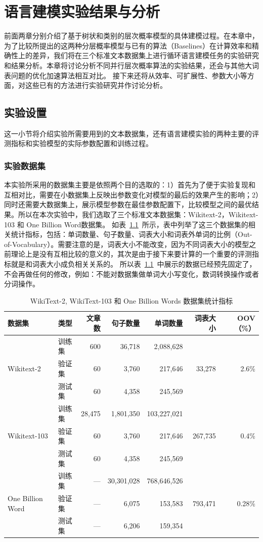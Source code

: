 
\chapter{语言建模实验结果与分析}
前面两章分别介绍了基于树状和类别的层次概率模型的具体建模过程。在本章中，为了比较所提出的这两种分层概率模型与已有的算法（Baselines）在计算效率和精确性上的差异，我们将在三个标准文本数据集上进行循环语言建模任务的实验研究和结果分析。本章将讨论分析不同并行层次概率算法的实验结果，还会与其他大词表问题的优化加速算法相互对比。 接下来还将从效率、可扩展性、参数大小等方面，对这些已有的方法进行实验研究并作讨论分析。

\section{实验设置}
这一小节将介绍实验所需要用到的文本数据集，还有语言建模实验的两种主要的评测指标和实验模型的实际参数配置和训练过程。
\subsection{实验数据集}
本实验所采用的数据集主要是依照两个目的选取的：1）首先为了便于实验复现和互相对比，需要在小数据集上反映出参数变化对模型的最后的效果产生的影响；2）同时还需要大数据集上，展示模型参数在最佳参数配置下，比较模型之间的最优结果。所以在本次实验中，我们选取了三个标准文本数据集：Wikitext-2，Wikitext-103 和 One Billion Word数据集。
如表~\ref{tab:dataset}~所示，表中列举了这三个数据集的相关统计指标，包括：单词数量、句子数量、词表大小和词表外单词的比例（Out-of-Vocabulary）。需要注意的是，词表大小不能改变，因为不同词表大小的模型之前理论上是没有互相比较的意义的，其次是由于接下来要计算的一个重要的评测指标就是和词表大小成负相关关系的。
所以表~\ref{tab:dataset}~中展示的数据已经预先固定了，不会再做任何的修改，例如：不能对数据集做单词大小写变化，数词转换操作或者分词操作。
\begin{table}[!ht]
  \centering
  \caption{WikiText-2, WikiText-103 和 One Billion Words 数据集统计指标 \label{tab:dataset}}
\begin{tabular}{llrrrrr}
\toprule
数据集& 类型& 文章数 & 句子数量 &  单词数量 &词表大小 & OOV （\%） \\ \midrule
\multirow{3}{*}{Wikitext-2} &训练集& 600 & 36,718 & 2,088,628 & \multirow{3}{*}{33,278} & \multirow{3}{*}{2.6\%} \\
&验证集& 60 &3,760 & 217,646  & &\\
&测试集& 60 & 4,358 & 245,569 & &\\
\midrule
\multirow{3}{*}{Wikitext-103} &训练集& 28,475 &  1,801,350 &  103,227,021 & \multirow{3}{*}{267,735} & \multirow{3}{*}{0.4\%} \\
&验证集& 60 &3,760 & 217,646  & &\\
&测试集& 60 & 4,358 & 245,569 & &\\
\midrule
\multirow{3}{*}{One Billion Word} &训练集& --- &30,301,028&768,646,526&   \multirow{3}{*}{793,471} &   \multirow{3}{*}{0.28\%} \\
 &验证集& --- &  6,075 &   153,583 &&\\
 &测试集 & --- &  6,206 &   159,354 &&\\
\bottomrule
\end{tabular}
\end{table}

